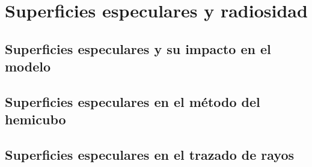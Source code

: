 \chapter{Superficies especulares y radiosidad}
\label{ch:chap03}

\section{Superficies especulares y su impacto en el modelo}
\label{sec:supespeculares}

\section{Superficies especulares en el método del hemicubo}
\label{sec:hemicuboespecular}

\section{Superficies especulares en el trazado de rayos}
\label{sec:hemicubo}